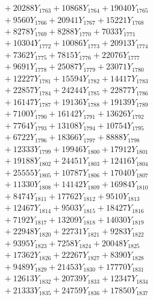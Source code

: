 \documentclass[a4paper,10pt]{article}
\begin{document}
{\begin{align}
&\;  + 20288 Y_{1763} + 10868 Y_{1764} + 19040 Y_{1765} \\[0.3ex]
&\;  + 9560 Y_{1766} + 20941 Y_{1767} + 15221 Y_{1768} \\[0.5ex]\allowbreak
&\;  + 8278 Y_{1769} + 8288 Y_{1770} + 7033 Y_{1771} \\[0.3ex]
&\;  + 10304 Y_{1772} + 10086 Y_{1773} + 20913 Y_{1774} \\[0.3ex]
&\;  + 7362 Y_{1775} + 7815 Y_{1776} + 22076 Y_{1777} \\[0.3ex]
&\;  + 9691 Y_{1778} + 25087 Y_{1779} + 23071 Y_{1780} \\[0.3ex]
&\;  + 12227 Y_{1781} + 15594 Y_{1782} + 14417 Y_{1783} \\[0.3ex]
&\;  + 22857 Y_{1784} + 24244 Y_{1785} + 22877 Y_{1786} \\[0.3ex]
&\;  + 16147 Y_{1787} + 19136 Y_{1788} + 19139 Y_{1789} \\[0.3ex]
&\;  + 7100 Y_{1790} + 16142 Y_{1791} + 13626 Y_{1792} \\[0.3ex]
&\;  + 7764 Y_{1793} + 13108 Y_{1794} + 10754 Y_{1795} \\[0.3ex]
&\;  + 6722 Y_{1796} + 18366 Y_{1797} + 8888 Y_{1798} \\[0.5ex]\allowbreak
&\;  + 12333 Y_{1799} + 19946 Y_{1800} + 17912 Y_{1801} \\[0.3ex]
&\;  + 19188 Y_{1802} + 24451 Y_{1803} + 12416 Y_{1804} \\[0.3ex]
&\;  + 25555 Y_{1805} + 10787 Y_{1806} + 17040 Y_{1807} \\[0.3ex]
&\;  + 11330 Y_{1808} + 14142 Y_{1809} + 16984 Y_{1810} \\[0.3ex]
&\;  + 8474 Y_{1811} + 17762 Y_{1812} + 9510 Y_{1813} \\[0.3ex]
&\;  + 12467 Y_{1814} + 9503 Y_{1815} + 18427 Y_{1816} \\[0.3ex]
&\;  + 7192 Y_{1817} + 13209 Y_{1818} + 14030 Y_{1819} \\[0.3ex]
&\;  + 22948 Y_{1820} + 22731 Y_{1821} + 9283 Y_{1822} \\[0.3ex]
&\;  + 9395 Y_{1823} + 7258 Y_{1824} + 20048 Y_{1825} \\[0.3ex]
&\;  + 17362 Y_{1826} + 22267 Y_{1827} + 8390 Y_{1828} \\[0.5ex]\allowbreak
&\;  + 9489 Y_{1829} + 21453 Y_{1830} + 17770 Y_{1831} \\[0.3ex]
&\;  + 12613 Y_{1832} + 20739 Y_{1833} + 12347 Y_{1834} \\[0.3ex]
&\;  + 21333 Y_{1835} + 24759 Y_{1836} + 17850 Y_{1837} \\[0.3ex]

\end{align}}
\end{document}
